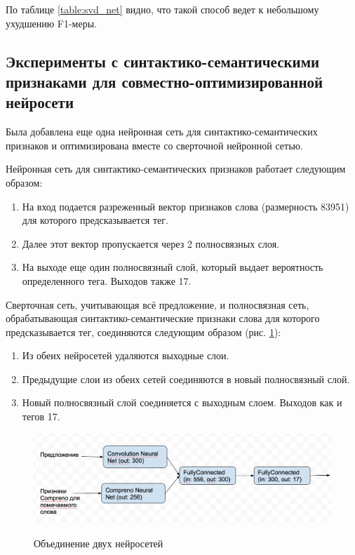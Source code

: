 По таблице \ref{table:svd_net} видно, что такой способ ведет к небольшому ухудшению F1-меры.


\subsection{Эксперименты с синтактико-семантическими признаками для совместно-оптимизированной нейросети}

Была добавлена еще одна нейронная сеть для синтактико-семантических признаков и оптимизирована
вместе со сверточной нейронной сетью.

Нейронная сеть для синтактико-семантических признаков работает следующим образом:
\begin{enumerate}
  \item На вход подается разреженный вектор признаков слова (размерность 83951) для которого предсказывается тег.
  \item Далее этот вектор пропускается через 2 полносвязных слоя.
  \item На выходе еще один полносвязный слой, который выдает вероятность определенного тега.
  Выходов также 17.
\end{enumerate}

Сверточная сеть, учитывающая всё предложение, и полносвязная сеть, обрабатывающая
синтактико-семантические признаки слова для которого предсказывается тег, соединяются следующим
образом (рис. \ref{figure:union_net}):
\begin{enumerate}
  \item Из обеих нейросетей удаляются выходные слои.
  \item Предыдущие слои из обеих сетей соединяются в новый полносвязный слой.
  \item Новый полносвязный слой соединяется с выходным слоем. Выходов как и тегов 17.
\end{enumerate}

\begin{figure}[h]
  \caption{Объединение двух нейросетей}
  \includegraphics[scale=0.5]{two-net.png}
  \label{figure:union_net}
\end{figure}

